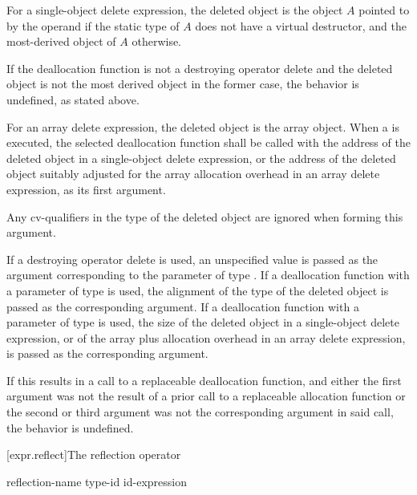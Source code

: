 \pnum
For a single-object delete expression,
the deleted object is
the object $A$ pointed to by the operand
if the static type of $A$ does not have a virtual destructor,
and the most-derived object of $A$ otherwise.
\begin{note}
If the deallocation function is not a destroying operator delete
and the deleted object is not the most derived object in the former case,
the behavior is undefined,
as stated above.
\end{note}
For an array delete expression,
the deleted object is
the array object.
When a 
is executed, the selected deallocation function shall be called with
the address of the deleted object
in a single-object delete expression, or
the address of the deleted object
suitably adjusted for the array allocation
overhead in an array delete expression,
as its first argument.
\begin{note}
Any cv-qualifiers in the type of the deleted object
are ignored when forming this argument.
\end{note}
If a destroying operator delete is used,
an unspecified value
is passed as the argument
corresponding to the parameter of type .
If a deallocation function
with a parameter of type 
is used,
the alignment of the type of the deleted object
is passed as the corresponding argument.
If a deallocation function
with a parameter of type  is used,
the size of the deleted object
in a single-object delete expression, or
of the array plus allocation overhead
in an array delete expression,
is passed as the corresponding argument.
\begin{note}
If this results in a call to a replaceable deallocation function,
and either
the first argument was not the result of
a prior call to a replaceable allocation function or
the second or third argument was not the corresponding argument in said call,
the behavior is undefined.
\end{note}

[expr.reflect]{The reflection operator}

\begin{bnf}
\br
    \terminal{\caret\caret} \terminal{::}\br
    \terminal{\caret\caret} reflection-name\br
    \terminal{\caret\caret} type-id\br
    \terminal{\caret\caret} id-expression
\end{bnf}


